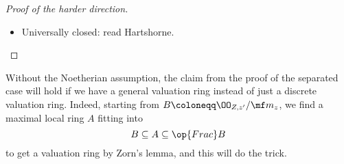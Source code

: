 \documentclass[../notes.tex]{subfiles}
\begin{document}
\begin{proof}[Proof of the harder direction]
\begin{itemize}
		Now, to prove the claim, we appeal to commutative algebra. Well, set $Z\coloneqq X\times_YX$, and we consider $\OO_{Z,z'}/\mf m_z$, which comes with it attached an embedding into $Z$. This is a local integral domain with generic point $z$ and closed point $z'$. As an aside, if $\OO_{Z,z'}/\mf m_z$ is one-dimensional, then $B$ we can take a normalization to make $B$ normal, so $B$ is regular (it's a one-dimensional, Noetherian, normal ring), so $B$ is a discrete valuation ring (it's a regular local ring of dimension $1$).

		So we are mostly interested in trying to force ourselves into a one-dimensional case. One way to finish is by specializing one point at a time to find a one-dimensional subscheme of $\Spec\OO_{Z,z'}/\mf m_z$, which can be found in \cite{rising-sea}. Another way to finish is by blowing up: one can blow up some local question like $k[x,y]_{(x,y)}$ by setting $u=x/y$ and $v=y$ to embed into $k[u,v]_{(v)}$, which turns our closed points into codimension-$1$ subschemes (``divisors'').
		\item Universally closed: read Hartshorne.
		\qedhere
	\end{itemize}
\end{proof}
\begin{remark}
	Without the Noetherian assumption, the claim from the proof of the separated case will hold if we have a general valuation ring instead of just a discrete valuation ring. Indeed, starting from $B\coloneqq\OO_{Z,z'}/\mf m_z$, we find a maximal local ring $A$ fitting into
	\[B\subseteq A\subseteq\op{Frac}B\]
	to get a valuation ring by Zorn's lemma, and this will do the trick.
\end{remark}
\end{document}
